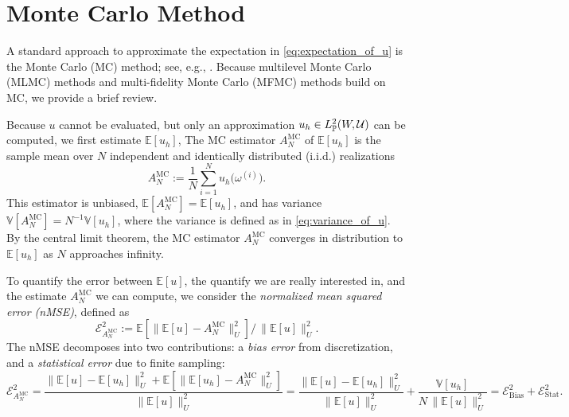 
\section{Monte Carlo Method}\label{sec:MC}

A standard approach to approximate the expectation in \eqref{eq:expectation_of_u} is the Monte Carlo (MC) method; 
see, e.g.,  \cite{MBGiles_2015a,MDGunzburger_CGWebster_GZhang_2014a}.
Because multilevel Monte Carlo (MLMC) methods \cite{MBGiles_2015a,SHeinrich_2001a} and 
multi-fidelity Monte Carlo (MFMC) methods  \cite{BPeherstorfer_KWillcox_MDGunzburger_2016a, BPeherstorfer_KWillcox_MDGunzburger_2018a} 
build on MC, we provide a brief review.


Because $u$ cannot be evaluated, but only an approximation $u_h \in   L_{\mathbb{P}}^2(W, \mathcal{U})$ can be 
computed, we first estimate $\mathbb{E}[u_h ]$, 
The MC estimator $A^{\text{MC}}_{N}$ of $\mathbb{E}[u_h ]$ 
is the sample mean over $N$ independent and identically distributed (i.i.d.) realizations 
\begin{equation}\label{eq:MC_estimator}
    A^{\text{MC}}_{N} := \frac{1}{N}\sum_{i=1}^{N} u_h \big(\omega^{(i)} \big).
\end{equation}
%
This estimator is unbiased,  $\mathbb{E}[A^{\text{MC}}_{N}] = \mathbb{E}[u_h ]$, 
and has variance $\mathbb{V}[A^{\text{MC}}_{N}] = N^{-1} \mathbb{V}[u_h ]$, 
where the variance is defined as in \eqref{eq:variance_of_u}.
By the central limit theorem, the MC estimator $A^{\text{MC}}_{N}$ converges in distribution to $\mathbb{E}[u_h]$ as $N$ approaches infinity. 

To quantify the error between $\mathbb{E}[u]$, the quantify we are really interested in, and the estimate $A^{\text{MC}}_{N}$ we can compute,
we consider the  {\it normalized mean squared error (nMSE)}, defined as
 \[
             \mathcal{E}_{A^{\text{MC}}_{N}}^2:= \mathbb E\left[ \big\| \mathbb{E}[u]-A^{\text{MC}}_{N}  \big\| _{U}^2\right]  
                                                                           \big/ \, \big\| \mathbb{E}[u]  \big\| _{U}^2.
\] 
The nMSE decomposes into two contributions: a {\it bias error} from  discretization, and a {\it statistical error} due to finite sampling:
%
\[
\mathcal{E}_{A^{\text{MC}}_{N}}^2 
= \frac{ \big\| \mathbb{E}[u]-\mathbb{E}[u_h ]  \big\| _{U}^2
               +\mathbb E\left[ \big\|  \mathbb{E}[u_h ] -A^{\text{MC}}_{N}  \big\| _{U}^2\right]}{ \big\| \mathbb{E}[u]  \big\| _{U}^2} 
= \frac{ \big\| \mathbb{E}[u]-\mathbb{E}[u_h ]  \big\| _{U}^2}{ \big\| \mathbb{E}[u]  \big\| _{U}^2}
    +\frac{\mathbb{V}\left[u_h \right]} {N \, \big\| \mathbb{E}[u]  \big\| _{U}^2}
=\mathcal{E}_{\text{Bias}}^2 + \mathcal{E}_{\text{Stat}}^2.
\]


